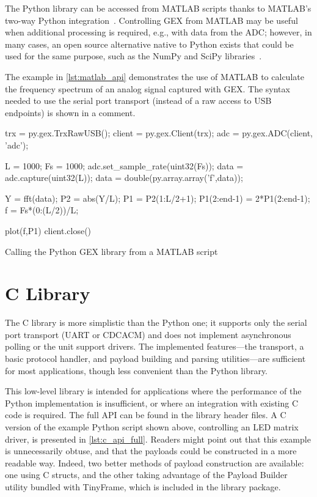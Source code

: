 The Python library can be accessed from MATLAB scripts thanks to MATLAB's two-way Python integration~\cite{matlabpy}. Controlling GEX from MATLAB may be useful when additional processing is required, e.g., with data from the \gls{ADC}; however, in many cases, an open source alternative native to Python exists that could be used for the same purpose, such as the NumPy and SciPy libraries~\cite{numpyscipy}.

The example in \cref{lst:matlab_api} demonstrates the use of MATLAB to calculate the frequency spectrum of an analog signal captured with GEX. The syntax needed to use the serial port transport (instead of a raw access to USB endpoints) is shown in a comment.

\begin{listing}[h]
	\begin{matlabcode}
	
	trx = py.gex.TrxRawUSB();
	client = py.gex.Client(trx);
	adc = py.gex.ADC(client, 'adc');
	
	L = 1000; Fs = 1000;
	adc.set_sample_rate(uint32(Fs)); %
	data = adc.capture(uint32(L));
	data = double(py.array.array('f',data)); %
	
	Y = fft(data);
	P2 = abs(Y/L);
	P1 = P2(1:L/2+1);
	P1(2:end-1) = 2*P1(2:end-1);
	f = Fs*(0:(L/2))/L;
	
	plot(f,P1)
	client.close()
	\end{matlabcode}
	\caption{\label{lst:matlab_api} Calling the Python GEX library from a MATLAB script}
\end{listing}


\section{C Library}

The C library is more simplistic than the Python one; it supports only the serial port transport (\gls{UART} or \gls{CDCACM}) and does not implement asynchronous polling or the unit support drivers. The implemented features---the transport, a basic protocol handler, and payload building and parsing utilities---are sufficient for most applications, though less convenient than the Python library.

This low-level library is intended for applications where the performance of the Python implementation is insufficient, or where an integration with existing C code is required. The full \gls{API} can be found in the library header files. A C version of the example Python script shown above, controlling an \gls{LED} matrix driver, is presented in \cref{lst:c_api_full}. Readers might point out that this example is unnecessarily obtuse, and that the payloads could be constructed in a more readable way. Indeed, two better methods of payload construction are available: one using C structs, and the other taking advantage of the Payload Builder utility bundled with TinyFrame, which is included in the library package.

